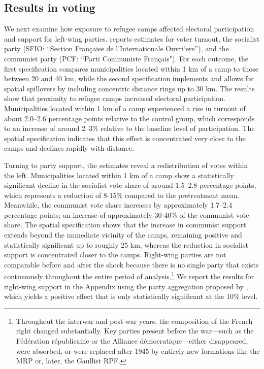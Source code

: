 

\subsection{Results in voting}

We next examine how exposure to refugee camps affected electoral participation and support for left-wing parties.  reports estimates for voter turnout, the socialist party (SFIO: “Section Fran\c{c}aise de l’Internationale Ouvri`ere”), and the communist party (PCF: “Parti Communiste Français"). For each outcome, the first specification compares municipalities located within 1 km of a camp to those between 20 and 40 km, while the second specification implements  and allows for spatial spillovers by including concentric distance rings up to 30 km. The results show that proximity to refugee camps increased electoral participation. Municipalities located within 1 km of a camp experienced a rise in turnout of about 2.0–2.6 percentage points relative to the control group, which corresponds to an increase of around 2–3\% relative to the baseline level of participation. The spatial specification indicates that this effect is concentrated very close to the camps and declines rapidly with distance.

Turning to party support, the estimates reveal a redistribution of votes within the left. Municipalities located within 1 km of a camp show a statistically significant decline in the socialist vote share of around 1.5–2.8 percentage points, which represents a reduction of 8-15\% compared to the pretreatment mean. Meanwhile, the communist vote share increases by approximately 1.7–2.4 percentage points; an increase of approximately 30-40\% of the communist vote share. The spatial specification shows that the increase in communist support extends beyond the immediate vicinity of the camps, remaining positive and statistically significant up to roughly 25 km, whereas the reduction in socialist support is concentrated closer to the camps. Right-wing parties are not comparable before and after the shock because there is no single party that exists continuously throughout the entire period of analysis.\footnote{Throughout the interwar and post-war years, the composition of the French right changed substantially. Key parties present before the war—such as the Fédération républicaine or the Alliance démocratique—either disappeared, were absorbed, or were replaced after 1945 by entirely new formations like the MRP or, later, the Gaullist RPF.} We report the results for right-wing support in the Appendix using the party aggregation proposed by \citet{piketty_histoire_2023}, which yields a positive effect that is only statistically significant at the 10\% level.

